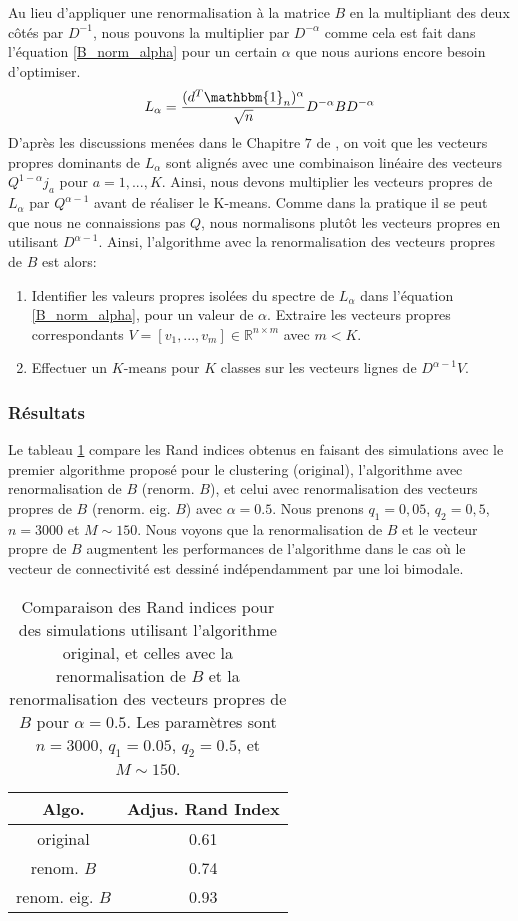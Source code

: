 \documentclass[../../main.tex]{subfiles} %
\begin{document}
Au lieu d'appliquer une renormalisation à la matrice $B$ en la multipliant des
deux côtés par $D^{-1}$, nous pouvons la multiplier par $D^{-\alpha}$ comme cela
est fait dans l'équation \ref{B_norm_alpha} pour un certain $\alpha$ que nous
aurions encore besoin d'optimiser. 
\begin{equation}\label{B_norm_alpha}
L_\alpha = \frac{(d^T \mathbbm{1}_n)^\alpha}{\sqrt{n}} D^{-\alpha} B D^{-\alpha}
\end{equation}
D'après les discussions menées dans le Chapitre $7$ de \cite{romain_couillet},
on voit que les vecteurs propres dominants de $L_\alpha$ sont alignés avec une
combinaison linéaire des vecteurs $Q^{1-\alpha} j_a$ pour $a = 1,...,K$. Ainsi,
nous devons multiplier les vecteurs propres de $L_\alpha$ par $Q^{\alpha-1}$
avant de réaliser le K-means. Comme dans la pratique il se peut que nous ne
connaissions pas $Q$, nous normalisons plutôt les vecteurs propres en utilisant
$D^{\alpha-1}$. Ainsi, l'algorithme avec la renormalisation des vecteurs propres
de $B$ est alors:
\begin{enumerate}
    \item Identifier les valeurs propres isolées du spectre de $L_\alpha$ dans
	    l'équation \ref{B_norm_alpha}, pour un valeur de $\alpha$. Extraire
	    les vecteurs propres correspondants
	    $V = [v_1, ..., v_m] \in \mathbb{R}^{n \times m}$ avec $m < K$. 
    \item Effectuer un $K$-means pour $K$ classes sur les vecteurs lignes de
	    $ D^{\alpha - 1} V$.
\end{enumerate}

\subsubsection{Résultats}
Le tableau \ref{table:1} compare les Rand indices obtenus en faisant des
simulations avec le premier algorithme proposé pour le clustering (original),
l'algorithme avec renormalisation de $B$ (renorm. $B$), et celui avec
renormalisation des vecteurs propres de $B$ (renorm. eig. $B$) avec
$\alpha = 0.5$. Nous prenons $q_1 = 0,05$, $q_2 = 0,5$, $n = 3000$ et
$M \sim 150$. Nous voyons que la renormalisation de $B$ et le vecteur propre de
$B$ augmentent les performances de l'algorithme dans le cas où le vecteur de
connectivité est dessiné indépendamment par une loi bimodale.

\begin{table}[h!]
\centering
\begin{tabular}{||c c||} 
 \hline
 Algo. & Adjus. Rand Index  \\ [0.5ex] 
 \hline\hline
 original & 0.61 \\ 
 \hline
 renom. $B$ & 0.74 \\
 \hline
 renom. eig. $B$ & 0.93 \\ [1ex] 
 \hline
\end{tabular}
\caption{Comparaison des Rand indices pour des simulations utilisant
l'algorithme original, et celles avec la renormalisation de $B$ et la
renormalisation des vecteurs propres de $B$ pour $\alpha = 0.5$. Les paramètres
sont $n = 3000$, $q_1 = 0.05$, $q_2 = 0.5$, et $M \sim 150$.}
\label{table:1}
\end{table}
\end{document}

